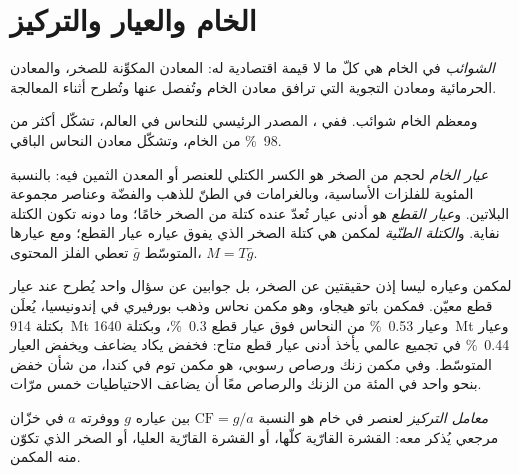 \section{الخام والعيار والتركيز}\label{sec:b2:ore-deposits:grade}

\begin{definition}[الشوائب]\label{def:b2:ore-deposits:ore}
\emph{الشوائب} في الخام هي كلّ ما لا قيمة اقتصادية له: المعادن
المكوِّنة للصخر، والمعادن الحرمائية ومعادن التجوية التي ترافق معادن الخام وتُفصل
عنها وتُطرح أثناء المعالجة.
\end{definition}

ومعظم الخام شوائب. ففي ، المصدر الرئيسي للنحاس في العالم، تشكّل  أكثر من
\qty{98}{\percent} من الخام، وتشكّل معادن النحاس الباقي.

\begin{definition}\label{def:b2:ore-deposits:grade}
\emph{عيار الخام} لحجم من الصخر هو الكسر الكتلي للعنصر
أو المعدن الثمين فيه: بالنسبة المئوية للفلزات الأساسية، وبالغرامات في الطنّ للذهب والفضّة
وعناصر مجموعة البلاتين. و\emph{عيار القطع} هو أدنى عيار
تُعدّ عنده كتلة من الصخر خامًا؛ وما دونه تكون الكتلة نفاية.
و\emph{الكتلة الطنّية} لمكمن هي كتلة الصخر الذي يفوق عياره عيار القطع؛ ومع
عيارها المتوسّط $\bar g$ تعطي الفلز المحتوى، $M = T\bar g$.
\end{definition}

 لمكمن وعياره ليسا إذن حقيقتين عن الصخر، بل جوابين
عن سؤال واحد يُطرح عند عيار قطع معيّن. فمكمن باتو هيجاو، وهو مكمن نحاس وذهب بورفيري في
إندونيسيا، يُعلَن بكتلة \qty{914}{Mt} وعيار \qty{0.53}{\percent} من النحاس فوق عيار قطع
\qty{0.3}{\percent}، وبكتلة \qty{1640}{Mt} وعيار \qty{0.44}{\percent} في تجميع عالمي
يأخذ أدنى عيار قطع متاح: فخفض  يكاد يضاعف 
ويخفض العيار المتوسّط. وفي مكمن زنك ورصاص رسوبي، هو مكمن توم في كندا، من شأن خفض
 بنحو واحد في المئة من الزنك والرصاص معًا أن يضاعف الاحتياطيات خمس مرّات.

\begin{definition}\label{def:b2:ore-deposits:cf}
\emph{معامل التركيز} لعنصر في خام هو النسبة
$\mathrm{CF} = g/a$ بين عياره $g$ ووفرته $a$ في خزّان مرجعي يُذكر معه:
القشرة القارّية كلّها، أو القشرة القارّية العليا، أو الصخر الذي تكوّن منه المكمن.
\end{definition}

